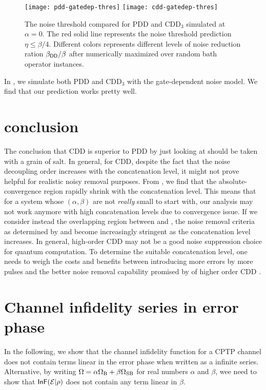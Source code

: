 \documentclass[aps,pra,reprint,superscriptaddress]{revtex4-2}
\begin{document}
 \begin{figure}[htbp]
    \centering
    \texttt{[image: pdd-gatedep-thres]}\quad
    \texttt{[image: cdd-gatedep-thres]}
    \caption{The noise threshold compared for PDD and $\mathrm{CDD}_3$ simulated at $\alpha=0$.
    The red solid line represents the noise threshold prediction $\eta\le\beta/4$. Different colors represents different levels of noise reduction ration $\beta_{\mathsf{DD}}/\beta$ after numerically maximized over random bath operator instances.
    }
    \label{fig:cdd-gatedep-thres}
\end{figure}

In , we simulate both PDD and $\mathrm{CDD}_3$ with the gate-dependent noise model. We find that our prediction works pretty well. 



\section{conclusion}
The conclusion that CDD is superior to PDD by just looking at  should be taken with a grain of salt. 
In general, for CDD,  despite the fact that the
noise decoupling order increases with the concatenation level,
it might not prove helpful for realistic noisy removal purposes. 
From , we find that the absolute-convergence region rapidly shrink with the concatenation level. This means that for a system whose $(\alpha,\beta)$ are not \emph{really} small to start with, our analysis may not work anymore with high concatenation levels due to convergence issue. 
If we consider instead the overlapping region between  and , the
noise removal criteria as determined by  and  become increasingly stringent as the concatenation level increases.  
In general, high-order CDD may not be a good noise suppression choice for quantum computation. To determine the suitable concatenation level, one needs to weigh the costs and benefits between introducing more errors by more pulses and the better noise removal capability promised by of higher order CDD .







\appendix
\section{Channel infidelity series in error phase}\label{app:infid-beta-series}
In the following, we show that the channel infidelity function  for a CPTP channel does not contain terms linear in the error phase when written as a infinite series.
Alternative, by writing  
$\Omega =  \alpha \Omega_{\mathrm{B}} + \beta \Omega_{\mathrm{SB}}$ for real numbers $\alpha$ and $\beta$, wee need to show that $\operatorname{\mathsf{InF}}(\mathcal{E}|\rho)$ does not contain any term linear in $\beta$.
\end{document}
